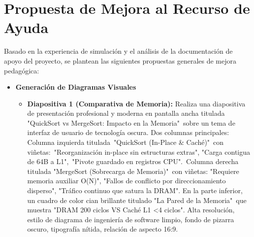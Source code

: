 \documentclass[12pt, a4paper]{article}
\begin{document}
\section{Propuesta de Mejora al Recurso de Ayuda}
Basado en la experiencia de simulación y el análisis de la documentación de apoyo del proyecto, se plantean las siguientes propuestas generales de mejora pedagógica: 

\begin{itemize}
\item\textbf{ Generación de Diagramas Visuales}
\begin{itemize}

    \item \textbf{Diapositiva 1 (Comparativa de Memoria):} {Realiza una diapositiva de presentación profesional y moderna en pantalla ancha titulada "QuickSort vs MergeSort: Impacto en la Memoria"\ sobre un tema de interfaz de usuario de tecnología oscura. Dos columnas principales: Columna izquierda titulada\ "QuickSort (In-Place & Caché)"\ con viñetas:\ "Reorganización in-place sin estructuras extras", 
    "Carga contigua de 64B a L1",\ "Pivote guardado en registros CPU".\ Columna derecha titulada "MergeSort (Sobrecarga de Memoria)"\ con viñetas: "Requiere memoria auxiliar O(N)", "Fallos de conflicto por direccionamiento disperso", "Tráfico continuo que satura la DRAM". En la parte inferior, un cuadro de color cian brillante titulado "La Pared de la Memoria"\ que muestra "DRAM 200 ciclos VS Caché L1 <4 ciclos". Alta resolución, estilo de diagrama de ingeniería de software limpio, fondo de pizarra oscuro, tipografía nítida, relación de aspecto 16:9.}\\
    

\end{itemize}
\end{itemize}
\end{document}
